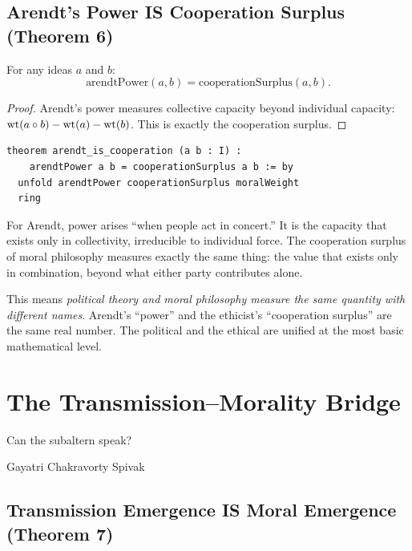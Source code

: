 \section{Arendt's Power IS Cooperation Surplus (Theorem 6)}

\begin{theorem}
\label{thm:arendt-cooperation}
For any ideas $a$ and $b$:
\[
\text{arendtPower}(a, b) = \text{cooperationSurplus}(a, b).
\]
\end{theorem}

\begin{proof}
Arendt's power measures collective capacity beyond individual capacity: $\operatorname{wt}(a \circ b) - \operatorname{wt}(a) - \operatorname{wt}(b)$.  This is exactly the cooperation surplus.
\end{proof}

\begin{lstlisting}
theorem arendt_is_cooperation (a b : I) :
    arendtPower a b = cooperationSurplus a b := by
  unfold arendtPower cooperationSurplus moralWeight
  ring
\end{lstlisting}

\begin{interpretation}
For Arendt, power arises ``when people act in concert.''  It is the capacity that exists only in collectivity, irreducible to individual force.  The cooperation surplus of moral philosophy measures exactly the same thing: the value that exists only in combination, beyond what either party contributes alone.

This means \emph{political theory and moral philosophy measure the same quantity with different names}.  Arendt's ``power'' and the ethicist's ``cooperation surplus'' are the same real number.  The political and the ethical are unified at the most basic mathematical level.
\end{interpretation}


\chapter{The Transmission--Morality Bridge}

\epigraph{Can the subaltern speak?}{Gayatri Chakravorty Spivak}

\section{Transmission Emergence IS Moral Emergence (Theorem 7)}

